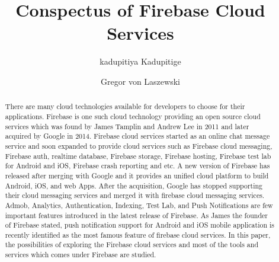 
\title{Conspectus of Firebase Cloud Services}


\author{kadupitiya Kadupitige}

\author{Gregor von Laszewski}


\renewcommand{\shortauthors}{G. v. Laszewski}


\begin{abstract}
There are many cloud technologies available for developers to choose
for their applications.  Firebase is one such cloud technology
providing an open source cloud services which was found by James
Tamplin and Andrew Lee in 2011 and later acquired by Google in
2014. Firebase cloud services started as an online chat message
service and soon expanded to provide cloud services such as Firebase
cloud messaging, Firebase auth, realtime database, Firebase storage,
Firebase hosting, Firebase test lab for Android and iOS, Firebase
crash reporting and etc. A new version of Firebase has released after
merging with Google and it provides an unified cloud platform to build
Android, iOS, and web Apps.  After the acquisition, Google has stopped
supporting their cloud messaging services and merged it with firebase
cloud messaging services. Admob, Analytics, Authentication, Indexing,
Test Lab, and Push Notifications are few important features introduced
in the latest release of Firebase. As James the founder of Firebase
stated, push notification support for Android and iOS mobile
application is recently identified as the most famous feature of
firebase cloud services.  In this paper, the possibilities
of exploring the Firebase cloud services and most of the tools and
services which comes under Firebase are studied.

\end{abstract}



\maketitle


